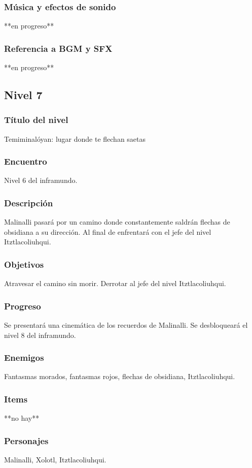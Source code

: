 \documentclass[11pt,letterpaper]{article}
\begin{document}
	\subsubsection{Música y efectos de sonido}
	**en progreso**
	\subsubsection{Referencia a BGM y SFX}
	**en progreso**
	
		\subsection{Nivel 7}
	\subsubsection{Título del nivel}
	Temiminalóyan: lugar donde te flechan saetas
	\subsubsection{Encuentro}
	Nivel 6 del inframundo.
	\subsubsection{Descripción}
	Malinalli pasará por un camino donde constantemente saldrán flechas de obsidiana a su dirección. Al final de enfrentará con el jefe del nivel Itztlacoliuhqui.
	\subsubsection{Objetivos}
	Atravesar el camino sin morir. Derrotar al jefe del nivel Itztlacoliuhqui.
	\subsubsection{Progreso}
	Se presentará una cinemática de los recuerdos de Malinalli. Se desbloqueará el nivel 8 del inframundo. 
	\subsubsection{Enemigos}
	Fantasmas morados, fantasmas rojos, flechas de obsidiana, Itztlacoliuhqui.
	\subsubsection{Items}
	**no hay**
	\subsubsection{Personajes}
	Malinalli, Xolotl, Itztlacoliuhqui.
\end{document}
